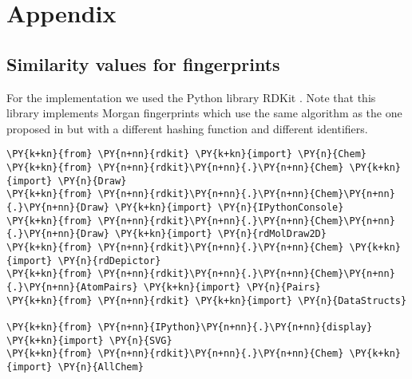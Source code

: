 
	
	






\appendix
\section*{Appendix}


\subsection{Similarity values for fingerprints}
\label{sec:a_sim}
For the implementation we used the Python library RDKit \citep{rdkit}. Note that this library implements Morgan fingerprints which use the same algorithm as the one proposed in \citep{ECFP} but with a different hashing function and different identifiers.
    
    
    
    
    \hypersetup{
    	breaklinks=true,  %
    	colorlinks=true,
    	urlcolor=urlcolor,
    	linkcolor=linkcolor,
    	citecolor=citecolor,
    }
    \footnotesize
    

\begin{tcolorbox}[breakable, size=fbox, boxrule=1pt, pad at break*=1mm,colback=cellbackground, colframe=cellborder]
\begin{Verbatim}[commandchars=\\\{\}]
\PY{k+kn}{from} \PY{n+nn}{rdkit} \PY{k+kn}{import} \PY{n}{Chem}
\PY{k+kn}{from} \PY{n+nn}{rdkit}\PY{n+nn}{.}\PY{n+nn}{Chem} \PY{k+kn}{import} \PY{n}{Draw}
\PY{k+kn}{from} \PY{n+nn}{rdkit}\PY{n+nn}{.}\PY{n+nn}{Chem}\PY{n+nn}{.}\PY{n+nn}{Draw} \PY{k+kn}{import} \PY{n}{IPythonConsole}
\PY{k+kn}{from} \PY{n+nn}{rdkit}\PY{n+nn}{.}\PY{n+nn}{Chem}\PY{n+nn}{.}\PY{n+nn}{Draw} \PY{k+kn}{import} \PY{n}{rdMolDraw2D}
\PY{k+kn}{from} \PY{n+nn}{rdkit}\PY{n+nn}{.}\PY{n+nn}{Chem} \PY{k+kn}{import} \PY{n}{rdDepictor}
\PY{k+kn}{from} \PY{n+nn}{rdkit}\PY{n+nn}{.}\PY{n+nn}{Chem}\PY{n+nn}{.}\PY{n+nn}{AtomPairs} \PY{k+kn}{import} \PY{n}{Pairs}
\PY{k+kn}{from} \PY{n+nn}{rdkit} \PY{k+kn}{import} \PY{n}{DataStructs}

\PY{k+kn}{from} \PY{n+nn}{IPython}\PY{n+nn}{.}\PY{n+nn}{display} \PY{k+kn}{import} \PY{n}{SVG}
\PY{k+kn}{from} \PY{n+nn}{rdkit}\PY{n+nn}{.}\PY{n+nn}{Chem} \PY{k+kn}{import} \PY{n}{AllChem}
\end{Verbatim}
\end{tcolorbox}

